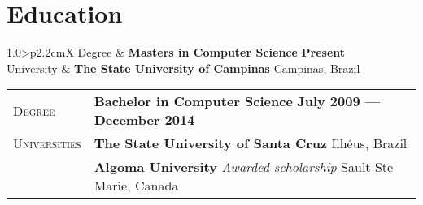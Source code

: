 \documentclass[9pt, a4paper, oneside, final]{scrartcl} %
\newcommand{\gray}{\rowcolor[gray]{.90}} %
\begin{document}
%
%
%


\section{Education}

\begin{center}
\begin{tabularx}{1.0\linewidth}{>{\raggedleft\scshape}p{2.2cm}X}
\gray Degree & \textbf{Masters in Computer Science} \hfill \textbf{Present}\\
\gray University & \textbf{The State University of Campinas} \hfill Campinas, Brazil\\
\end{tabularx}
\end{center}

\begin{center}
\begin{tabularx}{1.0\linewidth}{>{\raggedleft\scshape}p{2.2cm}X}
\gray Degree & \textbf{Bachelor in Computer Science} \hfill \textbf{July 2009 --- December 2014}\\
\gray Universities & \textbf{The State University of Santa Cruz} \hfill Ilhéus, Brazil\\ 
\gray & \textbf{Algoma University} \textit{Awarded scholarship}  \hfill Sault Ste Marie, Canada\\
\end{tabularx}
\end{center}
\end{document}
